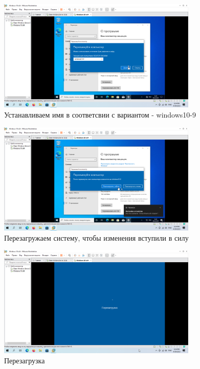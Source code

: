 \documentclass[a4paper]{article}
\begin{document}
  \begin{figure}[H]
    \centering
    \includegraphics[width=0.85\textwidth]{Screenshot_95}
    \caption{Устанавливаем имя в соответсвии с вариантом - windows10-9}
    \label{img:95}
  \end{figure}

  \begin{figure}[H]
    \centering
    \includegraphics[width=0.85\textwidth]{Screenshot_96}
    \caption{Перезагружаем систему, чтобы изменения вступили в силу}
    \label{img:96}
  \end{figure}

  \begin{figure}[H]
    \centering
    \includegraphics[width=0.85\textwidth]{Screenshot_97}
    \caption{Перезагрузка}
    \label{img:97}
  \end{figure}
\end{document}
